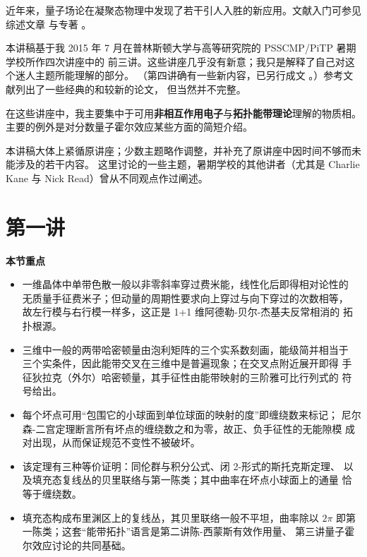 \documentclass[11pt,a4paper]{article}
\numberwithin{equation}{section}
\newenvironment{keytakeaways}
  {\par\medskip\noindent\textbf{本节重点}\begin{itemize}\small}
  {\end{itemize}\par\medskip}
\begin{document}
近年来，量子场论在凝聚态物理中发现了若干引人入胜的新应用。文献入门可参见综述文章
\cite{KH,ZQ,MZ} 与专著 \cite{BH}。

本讲稿基于我 2015 年 7 月在普林斯顿大学与高等研究院的 PSSCMP/PiTP 暑期学校所作四次讲座中的
前三讲。这些讲座几乎没有新意；我只是解释了自己对这个迷人主题所能理解的部分。
（第四讲确有一些新内容，已另行成文 \cite{Witten}。）参考文献列出了一些经典的和较新的论文，
但当然并不完整。

在这些讲座中，我主要集中于可用\textbf{非相互作用电子}与\textbf{拓扑能带理论}理解的物质相。
主要的例外是对分数量子霍尔效应某些方面的简短介绍。

本讲稿大体上紧循原讲座；少数主题略作调整，并补充了原讲座中因时间不够而未能涉及的若干内容。
这里讨论的一些主题，暑期学校的其他讲者（尤其是 Charlie Kane 与 Nick Read）曾从不同观点作过阐述。


\section{第一讲}

\begin{keytakeaways}
  \item 一维晶体中单带色散一般以非零斜率穿过费米能，线性化后即得相对论性的
        无质量手征费米子；但动量的周期性要求向上穿过与向下穿过的次数相等，
        故左行模与右行模一样多，这正是 1+1 维阿德勒-贝尔-杰基夫反常相消的
        拓扑根源。
  \item 三维中一般的两带哈密顿量由泡利矩阵的三个实系数刻画，能级简并相当于
        三个实条件，因此能带交叉在三维中是普遍现象；在交叉点附近展开即得
        手征狄拉克（外尔）哈密顿量，其手征性由能带映射的三阶雅可比行列式的
        符号给出。
  \item 每个坏点可用“包围它的小球面到单位球面的映射的度”即缠绕数来标记；
        尼尔森-二宫定理断言所有坏点的缠绕数之和为零，故正、负手征性的无能隙模
        成对出现，从而保证规范不变性不被破坏。
  \item 该定理有三种等价证明：同伦群与积分公式、闭 2-形式的斯托克斯定理、
        以及填充态复线丛的贝里联络与第一陈类；其中曲率在坏点小球面上的通量
        恰等于缠绕数。
  \item 填充态构成布里渊区上的复线丛，其贝里联络一般不平坦，曲率除以 $2\pi$
        即第一陈类；这套“能带拓扑”语言是第二讲陈-西蒙斯有效作用量、
        第三讲量子霍尔效应讨论的共同基础。
\end{keytakeaways}
\end{document}
